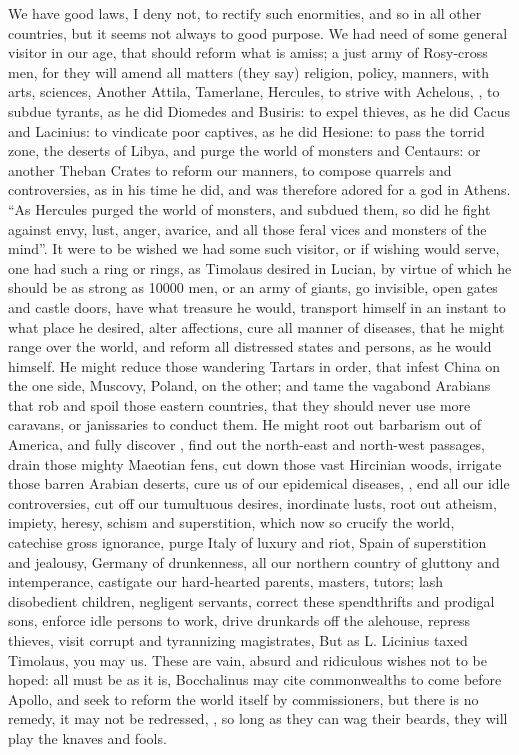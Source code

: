 We have good laws, I deny not, to rectify such enormities, and so in all other
countries, but it seems not always to good purpose. We had need of some general
visitor in our age, that should reform what is amiss; a just army of Rosy-cross
men, for they will amend all matters (they say) religion, policy, manners, with
arts, sciences, \etc{} Another Attila, Tamerlane, Hercules, to strive with
Achelous, , to subdue tyrants, as
he did Diomedes and Busiris: to expel thieves, as he did
Cacus and Lacinius: to vindicate poor captives, as he did Hesione: to pass the
torrid zone, the deserts of Libya, and purge the world of monsters and
Centaurs: or another Theban Crates to reform our manners, to compose quarrels
and controversies, as in his time he did, and was therefore adored for a god in
Athens. \enquote{As Hercules purged the world of monsters, and
subdued them, so did he fight against envy, lust, anger, avarice, \etc{} and
all those feral vices and monsters of the mind}. It were to be wished we had
some such visitor, or if wishing would serve, one had such a ring or rings, as
Timolaus desired in Lucian, by virtue of which he should be
as strong as 10\thinspace{}000 men, or an army of giants, go invisible, open
gates and castle doors, have what treasure he would, transport himself in an
instant to what place he desired, alter affections, cure all manner of
diseases, that he might range over the world, and reform all distressed states
and persons, as he would himself. He might reduce those wandering Tartars in
order, that infest China on the one side, Muscovy, Poland, on the other; and
tame the vagabond Arabians that rob and spoil those eastern countries, that
they should never use more caravans, or janissaries to conduct them. He might
root out barbarism out of America, and fully discover , find out the north-east and north-west passages, drain those mighty
Maeotian fens, cut down those vast Hircinian woods, irrigate those barren
Arabian deserts, \etc{} cure us of our epidemical diseases, , \etc{} end all our idle controversies, cut off our
tumultuous desires, inordinate lusts, root out atheism, impiety, heresy, schism
and superstition, which now so crucify the world, catechise gross ignorance,
purge Italy of luxury and riot, Spain of superstition and jealousy, Germany of
drunkenness, all our northern country of gluttony and intemperance, castigate
our hard-hearted parents, masters, tutors; lash disobedient children, negligent
servants, correct these spendthrifts and prodigal sons, enforce idle persons to
work, drive drunkards off the alehouse, repress thieves, visit corrupt and
tyrannizing magistrates, \etc{} But as L. Licinius taxed Timolaus, you may us.
These are vain, absurd and ridiculous wishes not to be hoped: all must be as it
is, Bocchalinus may cite commonwealths to come before
Apollo, and seek to reform the world itself by commissioners, but there is no
remedy, it may not be redressed, , so long as they can wag their beards, they will play the
knaves and fools.

